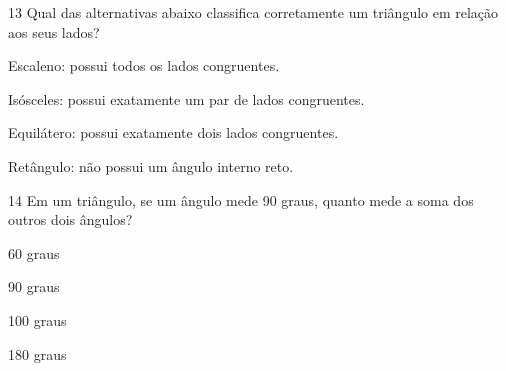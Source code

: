 




\num{13} Qual das alternativas abaixo classifica corretamente um triângulo em
relação aos seus lados?
\item Escaleno: possui todos os lados congruentes.
\item Isósceles: possui exatamente um par de lados congruentes.
\item Equilátero: possui exatamente dois lados congruentes.
\item Retângulo: não possui um ângulo interno reto.







\num{14} Em um triângulo, se um ângulo mede 90 graus, quanto mede a soma dos
outros dois ângulos?
\item 60 graus
\item 90 graus
\item 100 graus
\item 180 graus


